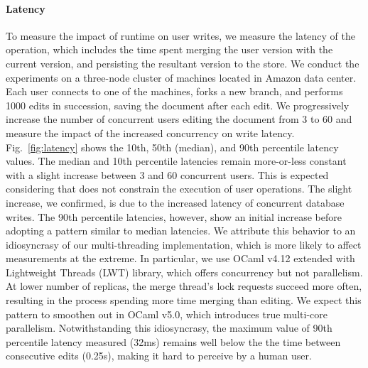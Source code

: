 \noindent\paragraph{Latency} To measure the impact of \quark runtime on user
writes, we measure the latency of the  operation, which
includes the time spent merging the user version with the current
version, and persisting the resultant version to the store. We conduct
the experiments on a three-node cluster of  machines
located in Amazon  data center. Each user connects to one
of the machines, forks a new branch, and performs 1000 edits in
succession, saving the document after each edit. We progressively
increase the number of concurrent users editing the document from 3 to
60 and measure the impact of the increased concurrency on write
latency.  Fig.~\ref{fig:latency} shows the 10th, 50th (median), and
90th percentile latency values. The median and 10th percentile
latencies remain more-or-less constant with a slight increase between
3 and 60 concurrent users. This is expected considering that \quark
does not constrain the execution of user operations. The slight
increase, we confirmed, is due to the increased latency of concurrent
database writes. The 90th percentile latencies, however, show an
initial increase before adopting a pattern similar to median
latencies. We attribute this behavior to an idiosyncrasy of our
multi-threading implementation, which is more likely to affect
measurements at the extreme. In particular, we use OCaml v4.12
extended with Lightweight Threads (LWT) library, which offers
concurrency but not parallelism.  At lower number of replicas, the
merge thread's lock requests succeed more often, resulting in the
process spending more time merging than editing. We expect this
pattern to smoothen out in OCaml v5.0, which introduces true
multi-core parallelism. Notwithstanding this idiosyncrasy, the maximum
value of 90th percentile latency measured (32ms) remains well below
the the time between consecutive edits (0.25s), making it hard to
perceive by a human user. 


